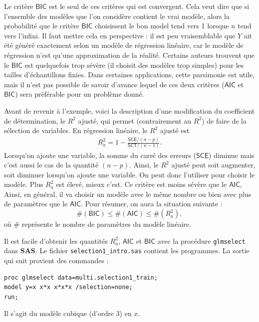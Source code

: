 \documentclass[
  11pt,
  letterpaper,
]{book}
\theoremstyle{definition}
\theoremstyle{definition}
\theoremstyle{definition}
\theoremstyle{remark}
\begin{document}
Le critère \(\mathsf{BIC}\) est le seul de ces critères qui est convergent. Cela veut dire que si l'ensemble des modèles que l'on considère contient le vrai modèle, alors la probabilité que le critère \(\mathsf{BIC}\) choisissent le bon model tend vers 1 lorsque \(n\) tend vers l'infini. Il faut mettre cela en perspective : il est peu vraisemblable que \(Y\) ait été généré exactement selon un modèle de régression linéaire, car le modèle de régression n'est qu'une approximation de la réalité. Certains auteurs trouvent que le \(\mathsf{BIC}\) est quelquefois trop sévère (il choisit des modèles trop simples) pour les tailles d'échantillons finies. Dans certaines applications, cette parsimonie est utile, mais il n'est pas possible de savoir d'avance lequel de ces deux critères (\(\mathsf{AIC}\) et \(\mathsf{BIC}\)) sera préférable pour un problème donné.

Avant de revenir à l'exemple, voici la description d'une modification du coefficient de détermination, le \(R^2\) ajusté, qui permet (contrairement au \(R^2\)) de faire de la sélection de variables. En régression linéaire, le \(R^2\) ajusté est
\begin{align*}
R^2_a=1-\frac{\mathsf{SCE}/(n-p)}{\mathsf{SCT}/(n-1)}.
\end{align*}
Lorsqu'on ajoute une variable, la somme du carré des erreurs (\(\mathsf{SCE}\)) diminue mais c'est aussi le cas de la quantité \((n-p)\). Ainsi, le \(R^2\) ajusté peut soit augmenter, soit diminuer lorsqu'on ajoute une variable. On peut donc l'utiliser pour choisir le modèle. Plus \(R^2_a\) est élevé, mieux c'est. Ce critère est moins sévère que le \(\mathsf{AIC}\), Ainsi, en général, il va choisir un modèle avec le même nombre ou bien avec plus de paramètres que le \(\mathsf{AIC}\). Pour résumer, on aura la situation suivante :
\[ \#(\mathsf{BIC}) \leq \#(\mathsf{AIC}) \leq \#(R^2_a),\]
où \(\#\) représente le nombre de paramètres du modèle linéaire.

Il est facile d'obtenir les quantités \(R^2_a\), \(\mathsf{AIC}\) et \(\mathsf{BIC}\) avec la procédure \texttt{glmselect} dans \textbf{SAS}. Le fichier \texttt{selection1\_intro.sas} contient les programmes. La sortie qui suit provient des commandes :

\begin{verbatim}
proc glmselect data=multi.selection1_train;
model y=x x*x x*x*x /selection=none;
run;
\end{verbatim}

Il s'agit du modèle cubique (d'ordre 3) en \(x\).
\end{document}
